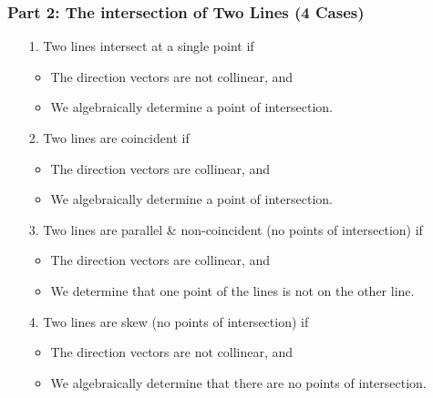 \documentclass{article}
\begin{document}
\subsubsection{Part 2: The intersection of Two Lines (4 Cases)}
\begin{enumerate}
    \item[1.] Two lines intersect at a single point if
    \begin{itemize}
        \item The direction vectors are not collinear, and
        \item We algebraically determine a point of intersection.
    \end{itemize}
    \item[2.] Two lines are coincident if
    \begin{itemize}
        \item The direction vectors are collinear, and
        \item We algebraically determine a point of intersection.
    \end{itemize}
    \item[3.] Two lines are parallel \& non-coincident (no points of intersection) if
    \begin{itemize}
        \item The direction vectors are collinear, and
        \item We determine that one point of the lines is not on the other line.
    \end{itemize}
    \item[4.] Two lines are skew (no points of intersection) if
    \begin{itemize}
        \item The direction vectors are not collinear, and
        \item We algebraically determine that there are no points of intersection.
    \end{itemize}
\end{enumerate}
\vspace{2em}
\end{document}
